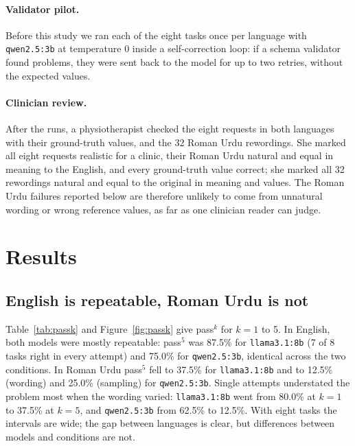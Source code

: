 \documentclass[11pt,a4paper]{article}
\newcommand{\code}[1]{\texttt{#1}}
\newcommand{\passk}[1]{pass$^{#1}$}
\begin{document}
\paragraph{Validator pilot.} Before this study we ran each of the eight tasks once per language with
\code{qwen2.5:3b} at temperature 0 inside a self-correction loop: if a schema validator found problems, they were
sent back to the model for up to two retries, without the expected values.

\paragraph{Clinician review.} After the runs, a physiotherapist checked the eight requests in both languages with their ground-truth values, and the 32 Roman Urdu rewordings. She marked all eight requests realistic for a clinic, their Roman Urdu natural and equal in meaning to the English, and every ground-truth value correct; she marked all 32 rewordings natural and equal to the original in meaning and values. The Roman Urdu failures reported below are therefore unlikely to come from unnatural wording or wrong reference values, as far as one clinician reader can judge.

\section{Results}

\subsection{English is repeatable, Roman Urdu is not}

Table~\ref{tab:passk} and Figure~\ref{fig:passk} give \passk{k} for $k=1$ to 5. In English, both models were mostly
repeatable: \passk{5} was 87.5\% for \code{llama3.1:8b} (7 of 8 tasks right in every attempt) and 75.0\% for
\code{qwen2.5:3b}, identical across the two conditions. In Roman Urdu \passk{5} fell to 37.5\% for
\code{llama3.1:8b} and to 12.5\% (wording) and 25.0\% (sampling) for \code{qwen2.5:3b}. Single attempts understated
the problem most when the wording varied: \code{llama3.1:8b} went from 80.0\% at $k=1$ to 37.5\% at $k=5$, and
\code{qwen2.5:3b} from 62.5\% to 12.5\%. With eight tasks the intervals are wide; the gap between languages is
clear, but differences between models and conditions are not.
\end{document}
